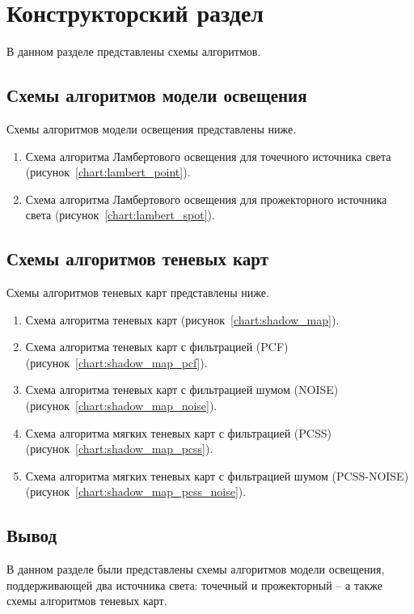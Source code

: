 \chapter{Конструкторский раздел}
\def \globalscale {1.0}

В данном разделе представлены схемы алгоритмов.

\section{Схемы алгоритмов модели освещения}

Схемы алгоритмов модели освещения представлены ниже.

\begin{enumerate}[label=\arabic*), labelsep=0.5em]
    \item Схема алгоритма Ламбертового освещения для точечного источника света (рисунок~\ref{chart:lambert_point}).
    \item Схема алгоритма Ламбертового освещения для прожекторного источника света (рисунок~\ref{chart:lambert_spot}).
\end{enumerate}


\FloatBarrier

\FloatBarrier

\section{Схемы алгоритмов теневых карт}

Схемы алгоритмов теневых карт представлены ниже.

\begin{enumerate}[label=\arabic*), labelsep=0.5em]
    \item Схема алгоритма теневых карт (\hbox{рисунок~\ref{chart:shadow_map}}).
    \item Схема алгоритма теневых карт с фильтрацией (PCF) (\hbox{рисунок~\ref{chart:shadow_map_pcf}}).
    \item Схема алгоритма теневых карт с фильтрацией шумом (NOISE) (\hbox{рисунок~\ref{chart:shadow_map_noise}}).
    \item Схема алгоритма мягких теневых карт с фильтрацией (PCSS) (\hbox{рисунок~\ref{chart:shadow_map_pcss}}).
    \item Схема алгоритма мягких теневых карт с фильтрацией шумом \hbox{(PCSS-NOISE)} (\hbox{рисунок~\ref{chart:shadow_map_pcss_noise}}).
\end{enumerate}


\FloatBarrier

\FloatBarrier

\FloatBarrier

\FloatBarrier

\FloatBarrier

\section*{Вывод}

В данном разделе были представлены схемы алгоритмов модели освещения,
поддерживающей два источника света: точечный и прожекторный -- а также
схемы алгоритмов теневых карт.